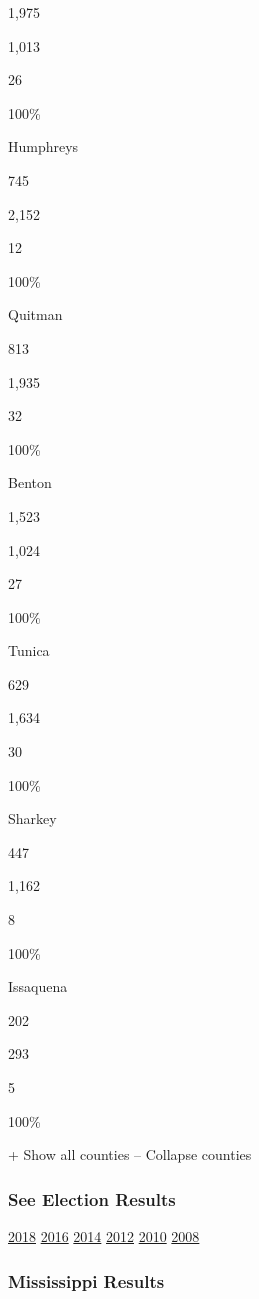 1,975

1,013

26

100\%

Humphreys

745

2,152

12

100\%

Quitman

813

1,935

32

100\%

Benton

1,523

1,024

27

100\%

Tunica

629

1,634

30

100\%

Sharkey

447

1,162

8

100\%

Issaquena

202

293

5

100\%

+ Show all counties -- Collapse counties

\hypertarget{see-election-results}{%
\subsubsection{See Election Results}\label{see-election-results}}

\href{https://www.nytimes3xbfgragh.onion/interactive/2018/us/elections/calendar-primary-results.html}{2018}
\href{https://www.nytimes3xbfgragh.onion/elections/results/president}{2016}
\href{https://www.nytimes3xbfgragh.onion/elections/2014/results/senate}{2014}
\href{https://www.nytimes3xbfgragh.onion/elections/2012/results/president.html}{2012}
\href{https://www.nytimes3xbfgragh.onion/elections/2010/results/senate.html}{2010}
\href{https://www.nytimes3xbfgragh.onion/elections/2008/results/president/map.html}{2008}

\hypertarget{mississippi-results}{%
\subsubsection{Mississippi Results}\label{mississippi-results}}

